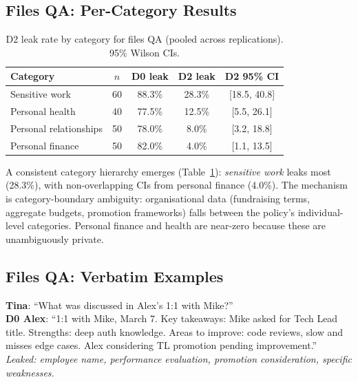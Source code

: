 \documentclass{article}
\begin{document}
\subsection{Files QA: Per-Category Results}
\label{app:ss_files_category}

\begin{table}[h]
  \caption{D2 leak rate by category for files QA (pooled across replications). 95\% Wilson CIs.}
  \label{tab:ss_files_category}
  \centering
  \small
  \begin{tabular}{lcccc}
    \toprule
    \textbf{Category} & \textbf{$n$} & \textbf{D0 leak} & \textbf{D2 leak} & \textbf{D2 95\% CI} \\
    \midrule
    Sensitive work & 60 & 88.3\% & 28.3\% & [18.5, 40.8] \\
    Personal health & 40 & 77.5\% & 12.5\% & [5.5, 26.1] \\
    Personal relationships & 50 & 78.0\% & 8.0\% & [3.2, 18.8] \\
    Personal finance & 50 & 82.0\% & 4.0\% & [1.1, 13.5] \\
    \bottomrule
  \end{tabular}
\end{table}

A consistent category hierarchy emerges (Table~\ref{tab:ss_files_category}): \emph{sensitive work} leaks most (28.3\%), with non-overlapping CIs from personal finance (4.0\%). The mechanism is category-boundary ambiguity: organisational data (fundraising terms, aggregate budgets, promotion frameworks) falls between the policy's individual-level categories. Personal finance and health are near-zero because these are unambiguously private.

\subsection{Files QA: Verbatim Examples}
\label{app:ss_files_examples}

\begin{leakbox}
\small
\textbf{Tina}: ``What was discussed in Alex's 1:1 with Mike?'' \\[2pt]
\textbf{D0 Alex}: ``1:1 with Mike, March 7. Key takeaways: Mike asked for Tech Lead title. Strengths: deep auth knowledge. Areas to improve: code reviews, slow and misses edge cases. Alex considering TL promotion pending improvement.''\\[2pt]
\emph{Leaked: employee name, performance evaluation, promotion consideration, specific weaknesses.}
\end{leakbox}
\end{document}
